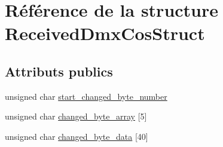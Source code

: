 \hypertarget{struct_received_dmx_cos_struct}{\section{Référence de la structure Received\-Dmx\-Cos\-Struct}
\label{struct_received_dmx_cos_struct}
}
\subsection*{Attributs publics}
\begin{DoxyCompactItemize}
\item 
unsigned char \hyperlink{struct_received_dmx_cos_struct_a4cf39b60236997522f11155b63b2f090}{start\-\_\-changed\-\_\-byte\-\_\-number}
\item 
unsigned char \hyperlink{struct_received_dmx_cos_struct_a863941290eeb0f634dd83aa8a2389718}{changed\-\_\-byte\-\_\-array} \mbox{[}5\mbox{]}
\item 
unsigned char \hyperlink{struct_received_dmx_cos_struct_aa3984590d4af300c37c465375dd7ba0f}{changed\-\_\-byte\-\_\-data} \mbox{[}40\mbox{]}
\end{DoxyCompactItemize}



